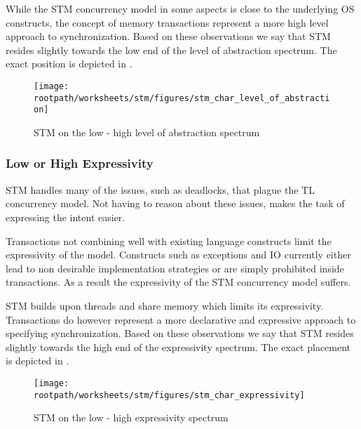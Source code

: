 While the \ac{STM} concurrency model in some aspects is close to the underlying \ac{OS} constructs, the concept of memory transactions represent a more high level approach to synchronization. Based on these observations we say that \ac{STM} resides slightly towards the low end of the level of abstraction spectrum. The exact position is depicted in .

\begin{figure}[htbp]
\centering
 \texttt{[image: \\rootpath/worksheets/stm/figures/stm\_char\_level\_of\_abstraction]} 
 \caption{\ac{STM} on the low - high level of abstraction spectrum}
\label{fig:char_stm_level_of_abstraction}
\end{figure}

\subsubsection{Low or High Expressivity}\label{sec:stm_expressivity}

\ac{STM} handles many of the issues, such as deadlocks, that plague the \ac{TL} concurrency model. Not having to reason about these issues, makes the task of expressing the intent easier. 

Transactions not combining well with existing language constructs limit the expressivity of the model. Constructs such as exceptions and \ac{IO} currently either lead to non desirable implementation strategies or are simply prohibited inside transactions. As a result the expressivity of the \ac{STM} concurrency model suffers.

\ac{STM} builds upon threads and share memory which limits its expressivity. Transactions do however represent a more declarative and expressive approach to specifying synchronization. Based on these observations we say that \ac{STM} resides slightly towards the high end of the expressivity spectrum. The exact placement is depicted in .

\begin{figure}[htbp]
\centering
 \texttt{[image: \\rootpath/worksheets/stm/figures/stm\_char\_expressivity]} 
 \caption{\ac{STM} on the low - high expressivity spectrum}
\label{fig:char_stm_expressivity}
\end{figure}

